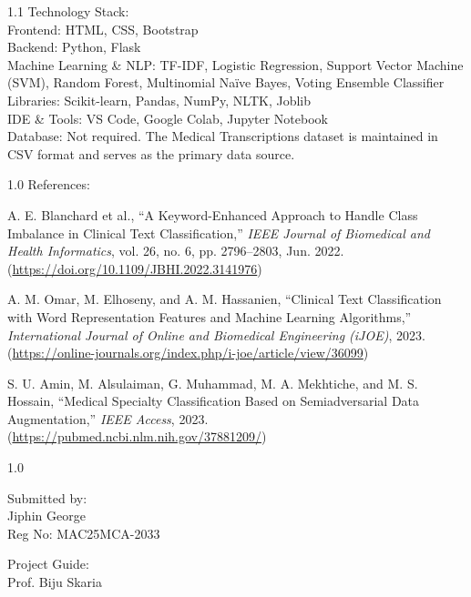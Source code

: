 \documentclass[12pt, a4paper]{article}
\begin{document}
\vspace{6pt}
\begin{spacing}{1.1}
\noindent Technology Stack: \\
Frontend: HTML, CSS, Bootstrap \\
Backend: Python, Flask \\
Machine Learning \& NLP: TF-IDF, Logistic Regression, Support Vector Machine (SVM), Random Forest, Multinomial Naïve Bayes, Voting Ensemble Classifier \\
Libraries: Scikit-learn, Pandas, NumPy, NLTK, Joblib \\
IDE \& Tools: VS Code, Google Colab, Jupyter Notebook \\
Database: Not required. The Medical Transcriptions dataset is maintained in CSV format and serves as the primary data source.
\end{spacing}

\vspace{8pt}
\begin{spacing}{1.0}
\noindent References:
\begin{enumerate}[label={[\arabic*]}, leftmargin=*, itemsep=0pt, parsep=0pt, topsep=2pt]
    \item A. E. Blanchard et al., ``A Keyword-Enhanced Approach to Handle Class Imbalance in Clinical Text Classification,'' \textit{IEEE Journal of Biomedical and Health Informatics}, vol. 26, no. 6, pp. 2796--2803, Jun. 2022. (\url{https://doi.org/10.1109/JBHI.2022.3141976})
    \item A. M. Omar, M. Elhoseny, and A. M. Hassanien, ``Clinical Text Classification with Word Representation Features and Machine Learning Algorithms,'' \textit{International Journal of Online and Biomedical Engineering (iJOE)}, 2023. (\url{https://online-journals.org/index.php/i-joe/article/view/36099})
    \item S. U. Amin, M. Alsulaiman, G. Muhammad, M. A. Mekhtiche, and M. S. Hossain, ``Medical Specialty Classification Based on Semiadversarial Data Augmentation,'' \textit{IEEE Access}, 2023. (\url{https://pubmed.ncbi.nlm.nih.gov/37881209/})
\end{enumerate}
\end{spacing}

\vfill %

\begin{spacing}{1.0}
\noindent
\begin{minipage}[t]{0.5\textwidth}
    Submitted by: \\
    Jiphin George \\
    Reg No: MAC25MCA-2033
\end{minipage}%
\begin{minipage}[t]{0.5\textwidth}
    \raggedleft
    Project Guide: \\
    Prof. Biju Skaria
\end{minipage}
\end{spacing}
\end{document}
